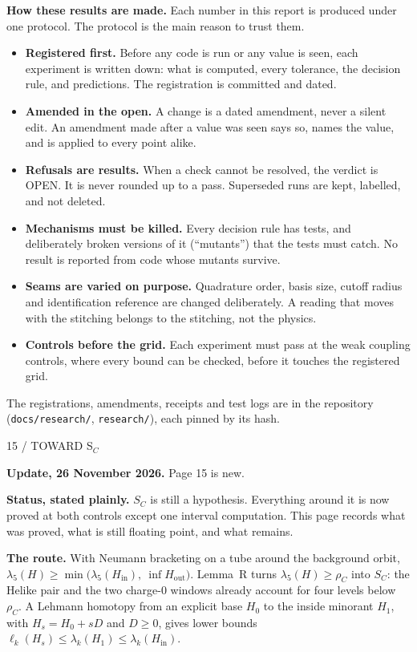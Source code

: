 \documentclass[11pt,letterpaper]{article}
\theoremstyle{plain}
\theoremstyle{definition}
\newcommand{\eyebrow}[1]{{\sffamily\small\color{teal}#1}\par}
\newcommand{\pagetitle}[2]{\eyebrow{#1}\vspace{3pt}{\LARGE #2}\par\vspace{5pt}}
\begin{document}
\medskip
\noindent\textbf{How these results are made.} Each number in this report is
produced under one protocol. The protocol is the main reason to trust them.
\begin{itemize}\setlength\itemsep{1pt}
\item \textbf{Registered first.} Before any code is run or any value is seen,
each experiment is written down: what is computed, every tolerance, the
decision rule, and predictions. The registration is committed and dated.
\item \textbf{Amended in the open.} A change is a dated amendment, never a
silent edit. An amendment made after a value was seen says so, names the value,
and is applied to every point alike.
\item \textbf{Refusals are results.} When a check cannot be resolved, the
verdict is OPEN. It is never rounded up to a pass. Superseded runs are kept,
labelled, and not deleted.
\item \textbf{Mechanisms must be killed.} Every decision rule has tests, and
deliberately broken versions of it (``mutants'') that the tests must catch.
No result is reported from code whose mutants survive.
\item \textbf{Seams are varied on purpose.} Quadrature order, basis size,
cutoff radius and identification reference are changed deliberately. A reading
that moves with the stitching belongs to the stitching, not the physics.
\item \textbf{Controls before the grid.} Each experiment must pass at the weak
coupling controls, where every bound can be checked, before it touches the
registered grid.
\end{itemize}
The registrations, amendments, receipts and test logs are in the repository
(\texttt{docs/research/}, \texttt{research/}), each pinned by its hash.

\newpage
\pagetitle{15 / TOWARD S$_C$}{Fold the base the way the geometry folds}
{\small\color{teal}\textbf{Update, 26 November 2026.} Page 15 is new.}\par\smallskip
\textbf{Status, stated plainly.} $S_C$ is still a hypothesis. Everything around it is now proved at both controls
except one interval computation. This page records what was proved, what is still floating point, and what remains.

\textbf{The route.} With Neumann bracketing on a tube around the background orbit,
$\lambda_5(H)\geq\min\bigl(\lambda_5(H_{\mathrm{in}}),\ \inf H_{\mathrm{out}}\bigr)$. Lemma~R turns
$\lambda_5(H)\geq\rho_C$ into $S_C$: the Helike pair and the two charge-0 windows already account for four levels
below $\rho_C$. A Lehmann homotopy from an explicit base $H_0$ to the inside minorant $H_1$, with
$H_s=H_0+sD$ and $D\geq0$, gives lower bounds $\ell_k(H_s)\leq\lambda_k(H_1)\leq\lambda_k(H_{\mathrm{in}})$.
\end{document}
